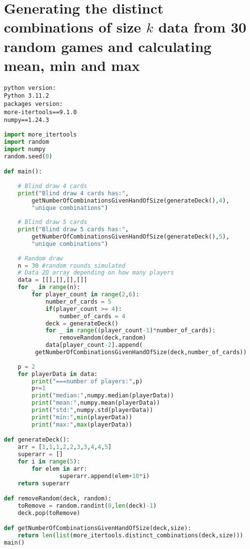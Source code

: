 
\section{Generating the distinct combinations of size $k$ data from 30 random games and calculating mean, min and max} \label{appendix:python-distinct-combinations}
\begin{verbatim}
python version:
Python 3.11.2
packages version:
more-itertools==9.1.0
numpy==1.24.3
\end{verbatim}

\begin{lstlisting}[language=python]
import more_itertools
import random
import numpy
random.seed(0)

def main():
    
    # Blind draw 4 cards
    print("Blind draw 4 cards has:", 
    	getNumberOfCombinationsGivenHandOfSize(generateDeck(),4),
		"unique combinations")
    
    # Blind draw 5 cards
    print("Blind draw 5 cards has:", 
    	getNumberOfCombinationsGivenHandOfSize(generateDeck(),5),
		"unique combinations")
    
    # Random draw
    n = 30 #random rounds simulated
    # Data 2D array depending on how many players
    data = [[],[],[],[]]
    for _ in range(n):
        for player_count in range(2,6):
            number_of_cards = 5
            if(player_count >= 4):
                number_of_cards = 4
            deck = generateDeck()
            for _ in range((player_count-1)*number_of_cards):
                removeRandom(deck,random)
            data[player_count-2].append(
	   	 getNumberOfCombinationsGivenHandOfSize(deck,number_of_cards))
    
    p = 2
    for playerData in data:
        print("===number of players:",p)
        p+=1
        print("median:",numpy.median(playerData))
        print("mean:",numpy.mean(playerData))
        print("std:",numpy.std(playerData))
        print("min:",min(playerData))
        print("max:",max(playerData))

def generateDeck():
    arr = [1,1,1,2,2,3,3,4,4,5]
    superarr = []
    for i in range(5):
        for elem in arr:
                superarr.append(elem+10*i)
    return superarr

def removeRandom(deck, random):
    toRemove = random.randint(0,len(deck)-1)
    deck.pop(toRemove)

def getNumberOfCombinationsGivenHandOfSize(deck,size):
    return len(list(more_itertools.distinct_combinations(deck,size)))
main()
\end{lstlisting}
